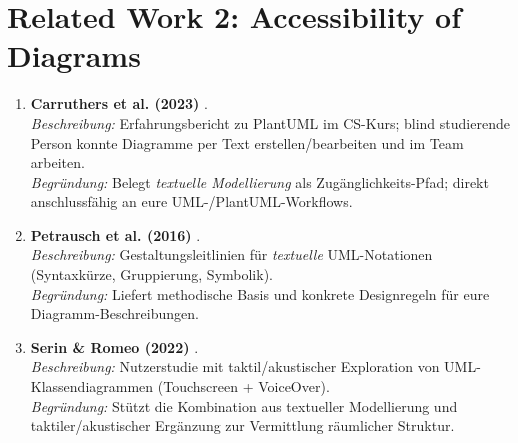\section{Related Work 2: Accessibility of Diagrams}
\begin{enumerate}
  \item \textbf{Carruthers et al. (2023)} \cite{Carruthers2023PlantUML}.\\
  \emph{Beschreibung:} Erfahrungsbericht zu PlantUML im CS-Kurs; blind studierende Person konnte Diagramme per Text erstellen/bearbeiten und im Team arbeiten.\\
  \emph{Begründung:} Belegt \emph{textuelle Modellierung} als Zugänglichkeits-Pfad; direkt anschlussfähig an eure UML-/PlantUML-Workflows.
  
  \item \textbf{Petrausch et al. (2016)} \cite{Petrausch2016UML}.\\
  \emph{Beschreibung:} Gestaltungsleitlinien für \emph{textuelle} UML-Notationen (Syntaxkürze, Gruppierung, Symbolik).\\
  \emph{Begründung:} Liefert methodische Basis und konkrete Designregeln für eure Diagramm-Beschreibungen.
  
  \item \textbf{Serin \& Romeo (2022)} \cite{Serin2022Diagrams}.\\
  \emph{Beschreibung:} Nutzerstudie mit taktil/akustischer Exploration von UML-Klassendiagrammen (Touchscreen + VoiceOver).\\
  \emph{Begründung:} Stützt die Kombination aus textueller Modellierung und taktiler/akustischer Ergänzung zur Vermittlung räumlicher Struktur.
\end{enumerate}

